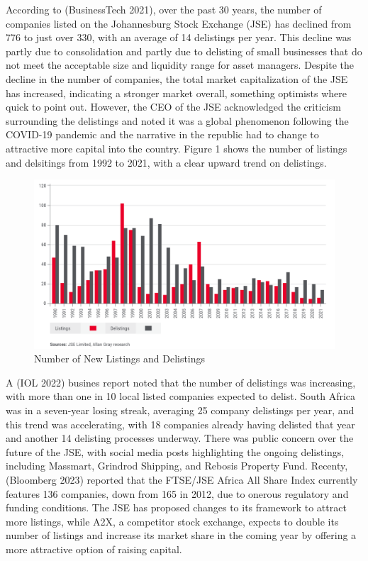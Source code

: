 \documentclass[
]{article}
\begin{document}
According to (BusinessTech 2021), over the past 30 years, the number of
companies listed on the Johannesburg Stock Exchange (JSE) has declined
from 776 to just over 330, with an average of 14 delistings per year.
This decline was partly due to consolidation and partly due to delisting
of small businesses that do not meet the acceptable size and liquidity
range for asset managers. Despite the decline in the number of
companies, the total market capitalization of the JSE has increased,
indicating a stronger market overall, something optimists where quick to
point out. However, the CEO of the JSE acknowledged the criticism
surrounding the delistings and noted it was a global phenomenon
following the COVID-19 pandemic and the narrative in the republic had to
change to attractive more capital into the country. Figure 1 shows the
number of listings and delsitings from 1992 to 2021, with a clear upward
trend on delistings.

\begin{figure}
\centering
\includegraphics{delist.png}
\caption{Number of New Listings and Delistings}
\end{figure}

A (IOL 2022) busines report noted that the number of delistings was
increasing, with more than one in 10 local listed companies expected to
delist. South Africa was in a seven-year losing streak, averaging 25
company delistings per year, and this trend was accelerating, with 18
companies already having delisted that year and another 14 delisting
processes underway. There was public concern over the future of the JSE,
with social media posts highlighting the ongoing delistings, including
Massmart, Grindrod Shipping, and Rebosis Property Fund. Recenty,
(Bloomberg 2023) reported that the FTSE/JSE Africa All Share Index
currently features 136 companies, down from 165 in 2012, due to onerous
regulatory and funding conditions. The JSE has proposed changes to its
framework to attract more listings, while A2X, a competitor stock
exchange, expects to double its number of listings and increase its
market share in the coming year by offering a more attractive option of
raising capital.
\end{document}

